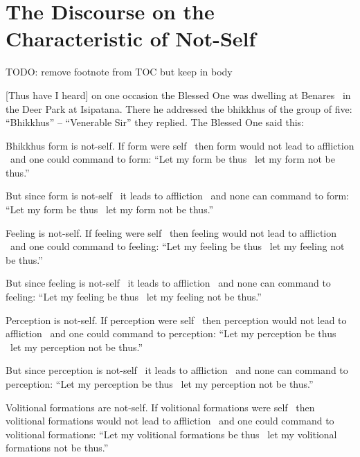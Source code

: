 \section{The Discourse on the Characteristic of Not-Self}
TODO: remove footnote from TOC but keep in body
\label{characteristic-of-not-self}

[Thus have I heard] on one occasion the Blessed One was dwelling at Benares \breathmark\ in the Deer Park at Isipatana. There he addressed the bhikkhus of the group of five: ``Bhikkhus'' – ``Venerable Sir'' they replied. The Blessed One said this:

Bhikkhus form is not-self. If form were self \breathmark\ then form would not lead to affliction \breathmark\ and one could command to form: ``Let my form be thus \breathmark\ let my form not be thus.''

But since form is not-self \breathmark\ it leads to affliction \breathmark\ and none can command to form: ``Let my form be thus \breathmark\ let my form not be thus.''

Feeling is not-self. If feeling were self \breathmark\ then feeling would not lead to affliction \breathmark\ and one could command to feeling: ``Let my feeling be thus \breathmark\ let my feeling not be thus.''

But since feeling is not-self \breathmark\ it leads to affliction \breathmark\ and none can command to feeling: ``Let my feeling be thus \breathmark\ let my feeling not be thus.''

Perception is not-self. If perception were self \breathmark\ then perception would not lead to affliction \breathmark\ and one could command to perception: ``Let my perception be thus \breathmark\ let my perception not be thus.''

But since perception is not-self \breathmark\ it leads to affliction \breathmark\ and none can command to perception: ``Let my perception be thus \breathmark\ let my perception not be thus.''

Volitional formations are not-self. If volitional formations were self \breathmark\ then volitional formations would not lead to affliction \breathmark\ and one could command to volitional formations: ``Let my volitional formations be thus \breathmark\ let my volitional formations not be thus.''

